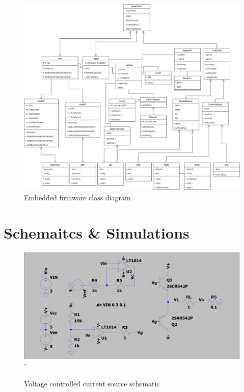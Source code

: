 \documentclass[10pt,twocolumn,letterpaper]{article}
\begin{document}
\begin{figure}[htb]
  \centering
  \includegraphics[width=\linewidth, keepaspectratio]{figures/emb-class-diagram.png}
  \caption{Embedded firmware class diagram}
  \label{fig:emb-class-diagram}
\end{figure}

\newpage
\section{Schemaitcs \& Simulations} \label{app:schematics}

\begin{figure}[htb]
  \centering
  \includegraphics[width=\linewidth, keepaspectratio]{figures/current-source-schematic.png}'
  \caption{Voltage controlled current source schematic}
  \label{fig:schm-current-source}
\end{figure}
\end{document}
